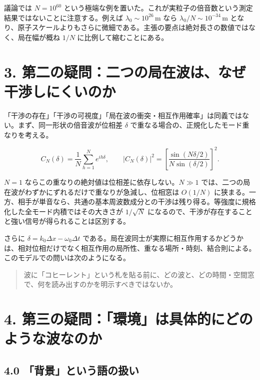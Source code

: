 \documentclass[
  a4paper,
]{ltjsarticle}
\begin{document}
議論では \(N=10^{60}\)
という極端な例を置いた。これが実粒子の倍音数という測定結果ではないことに注意する。例えば
\(\lambda_0\sim10^{26}\,\mathrm m\) なら
\(\lambda_0/N\sim10^{-34}\,\mathrm m\)
となり、原子スケールよりもさらに微細である。主張の要点は絶対長さの数値ではなく、局在幅が概ね
\(1/N\) に比例して縮むことにある。

\section{3.
第二の疑問：二つの局在波は、なぜ干渉しにくいのか}\label{ux7b2cux4e8cux306eux7591ux554fux4e8cux3064ux306eux5c40ux5728ux6ce2ux306fux306aux305cux5e72ux6e09ux3057ux306bux304fux3044ux306eux304b}

「干渉の存在」「干渉の可視度」「局在波の衝突・相互作用確率」は同義ではない。まず、同一形状の倍音波が位相差
\(\delta\) で重なる場合の、正規化したモード重なりを考える。

\[
C_N(\delta)=\frac1N\sum_{h=1}^N e^{ih\delta},
\qquad
|C_N(\delta)|^2=
\left[\frac{\sin(N\delta/2)}{N\sin(\delta/2)}\right]^2.
\]

\(N=1\) ならこの重なりの絶対値は位相差に依存しない。\(N\gg1\)
では、二つの局在波がわずかにずれるだけで重なりが急減し、位相窓は
\(O(1/N)\)
に狭まる。一方、相手が単音なら、共通の基本周波数成分との干渉は残り得る。等強度に規格化した全モード内積ではその大きさが
\(1/\sqrt N\)
になるので、干渉が存在することと強い信号が得られることは区別する。

さらに \(\delta=k_0\Delta x-\omega_0\Delta t\)
である。局在波同士が実際に相互作用するかどうかは、相対位相だけでなく相互作用の局所性、重なる場所・時刻、結合則による。このモデルでの問いは次のようになる。

\begin{quote}
波に「コヒーレント」という札を貼る前に、どの波と、どの時間・空間窓で、何を読み出すのかを明示すべきではないか。
\end{quote}

\section{4.
第三の疑問：「環境」は具体的にどのような波なのか}\label{ux7b2cux4e09ux306eux7591ux554fux74b0ux5883ux306fux5177ux4f53ux7684ux306bux3069ux306eux3088ux3046ux306aux6ce2ux306aux306eux304b}

\subsection{4.0
「背景」という語の扱い}\label{ux80ccux666fux3068ux3044ux3046ux8a9eux306eux6271ux3044}
\end{document}
